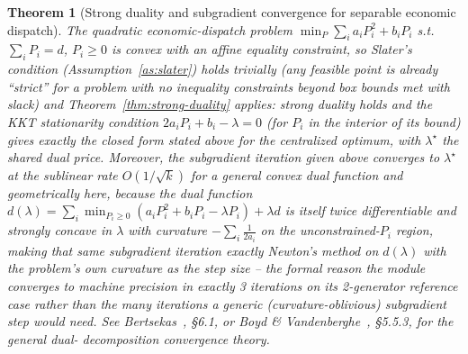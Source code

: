\documentclass[11pt]{report}
\theoremstyle{plain}
\newtheorem{theorem}{Theorem}[chapter]
\theoremstyle{definition}
\theoremstyle{remark}
\begin{document}
\begin{theorem}[Strong duality and subgradient convergence for separable economic dispatch]
\label{thm:dual-decomp}
The quadratic economic-dispatch problem $\min_P\sum_ia_iP_i^2+b_iP_i$
s.t.\ $\sum_iP_i=d$, $P_i\ge0$ is convex with an affine equality
constraint, so Slater's condition (Assumption~\ref{as:slater}) holds
trivially (any feasible point is already ``strict'' for a problem with
no inequality constraints beyond box bounds met with slack) and
Theorem~\ref{thm:strong-duality} applies: strong duality holds and the
KKT stationarity condition $2a_iP_i+b_i-\lambda=0$ (for $P_i$ in the
interior of its bound) gives exactly the closed form stated above
for the centralized optimum, with $\lambda^\star$ the shared dual price.
Moreover, the subgradient iteration given above converges to
$\lambda^\star$ at the sublinear rate $O(1/\sqrt{k})$ for a general
convex dual function and \emph{geometrically} here, because the dual
function $d(\lambda)=\sum_i\min_{P_i\ge0}(a_iP_i^2+b_iP_i-\lambda
P_i)+\lambda d$ is itself twice differentiable and strongly
concave in $\lambda$ with curvature $-\sum_i\tfrac1{2a_i}$ on the
unconstrained-$P_i$ region, making that same subgradient iteration exactly
Newton's method on $d(\lambda)$ with the problem's own curvature as the
step size -- the formal reason the module converges to machine precision
in exactly 3 iterations on its 2-generator reference case rather than the
many iterations a generic (curvature-oblivious) subgradient step would
need. See Bertsekas~\cite{bertsekasnlp}, \S6.1, or Boyd \&
Vandenberghe~\cite{boydconvex}, \S5.5.3, for the general dual-
decomposition convergence theory.
\end{theorem}
\end{document}
